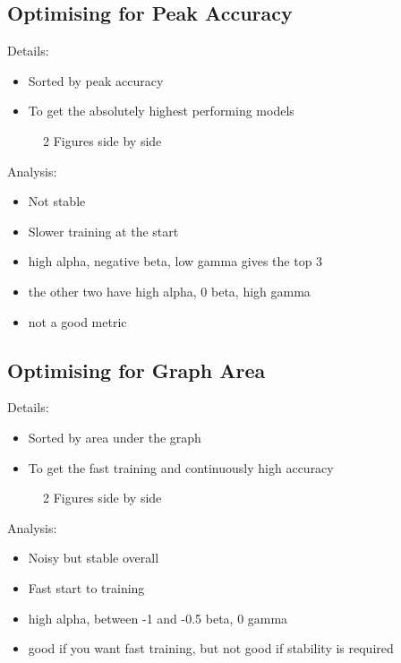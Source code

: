 \subsection{Optimising for Peak Accuracy}
Details:
\begin{itemize}
	\item Sorted by peak accuracy
	\item To get the absolutely highest performing models
\end{itemize}


\begin{figure}
	\centering
	\qquad
	\caption{2 Figures side by side}%
	\label{fig:ex_peak}%
\end{figure}

Analysis:
\begin{itemize}
	\item Not stable
	\item Slower training at the start
	\item high alpha, negative beta, low gamma gives the top 3
	\item the other two have high alpha, 0 beta, high gamma
	\item not a good metric
\end{itemize}

\subsection{Optimising for Graph Area}
Details:
\begin{itemize}
	\item Sorted by area under the graph
	\item To get the fast training and continuously high accuracy
\end{itemize}

\begin{figure}
	\centering
	\qquad
	\caption{2 Figures side by side}%
	\label{fig:ex_aug}%
\end{figure}

Analysis:
\begin{itemize}
	\item Noisy but stable overall
	\item Fast start to training
	\item high alpha, between -1 and -0.5 beta, 0 gamma
	\item good if you want fast training, but not good if stability is required
\end{itemize}

